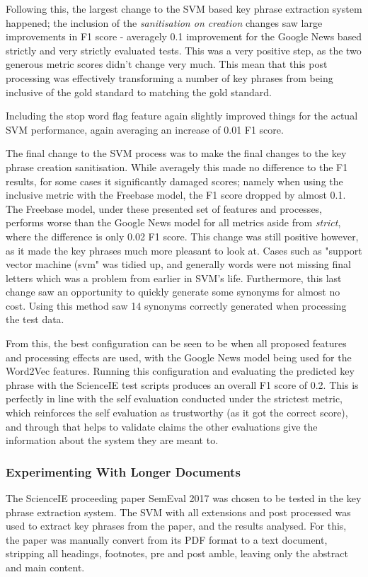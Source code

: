 Following this, the largest change to the SVM based key phrase extraction system happened; the inclusion of the \textit{sanitisation on creation} changes saw large improvements in F1 score - averagely 0.1 improvement for the Google News based strictly and very strictly evaluated tests. This was a very positive step, as the two generous metric scores didn't change very much. This mean that this post processing was effectively transforming a number of key phrases from being inclusive of the gold standard to matching the gold standard. 

Including the stop word flag feature again slightly improved things for the actual SVM performance, again averaging an increase of 0.01 F1 score.

The final change to the SVM process was to make the final changes to the key phrase creation sanitisation. While averagely this made no difference to the F1 results, for some cases it significantly damaged scores; namely when using the inclusive metric with the Freebase model, the F1 score dropped by almost 0.1. The Freebase model, under these presented set of features and processes, performs worse than the Google News model for all metrics aside from \textit{strict}, where the difference is only 0.02 F1 score. This change was still positive however, as it made the key phrases much more pleasant to look at. Cases such as "support vector machine (svm" was tidied up, and generally words were not missing final letters which was a problem from earlier in SVM's life. Furthermore, this last change saw an opportunity to quickly generate some synonyms for almost no cost. Using this method saw 14 synonyms correctly generated when processing the test data. 

From this, the best configuration can be seen to be when all proposed features and processing effects are used, with the Google News model being used for the Word2Vec features. Running this configuration and evaluating the predicted key phrase with the ScienceIE test scripts produces an overall F1 score of 0.2. This is perfectly in line with the self evaluation conducted under the strictest metric, which reinforces the self evaluation as trustworthy (as it got the correct score), and through that helps to validate claims the other evaluations give the information about the system they are meant to. 

\subsubsection{Experimenting With Longer Documents}
The ScienceIE proceeding paper SemEval 2017 \cite{Augenstein2017} was chosen to be tested in the key phrase extraction system. The SVM with all extensions and post processed was used to extract key phrases from the paper, and the results analysed. For this, the paper was manually convert from its PDF format to a text document, stripping all headings, footnotes, pre and post amble, leaving only the abstract and main content.

